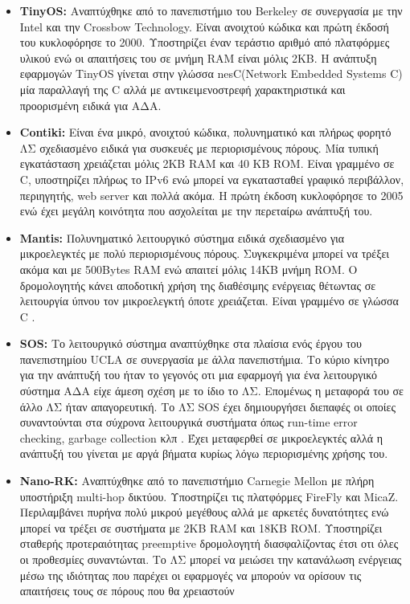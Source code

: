 \begin{itemize}
\item \textbf{TinyOS:} Αναπτύχθηκε από το πανεπιστήμιο του Berkeley σε συνεργασία με την Intel και την Crossbow Technology.
Είναι ανοιχτού κώδικα και πρώτη έκδοσή του κυκλοφόρησε το 2000.
Υποστηρίζει έναν τεράστιο αριθμό από πλατφόρμες υλικού ενώ οι απαιτήσεις του σε μνήμη RAM είναι μόλις 2KB.
Η ανάπτυξη εφαρμογών TinyOS γίνεται στην γλώσσα nesC(Network Embedded Systems C) μία παραλλαγή της C αλλά με αντικειμενοστρεφή χαρακτηριστικά και προορισμένη ειδικά
για ΑΔΑ.
\item \textbf{Contiki:} Είναι ένα μικρό, ανοιχτού κώδικα, πολυνηματικό και πλήρως φορητό ΛΣ σχεδιασμένο ειδικά για συσκευές με περιορισμένους πόρους.
Μία τυπική εγκατάσταση χρειάζεται μόλις 2KB RAM και 40 KB ROM.
Είναι γραμμένο σε C, υποστηρίζει πλήρως το IPv6 ενώ μπορεί να εγκατασταθεί γραφικό περιβάλλον, περιηγητής, web server και πολλά ακόμα.
Η πρώτη έκδοση κυκλοφόρησε το 2005 ενώ έχει μεγάλη κοινότητα που ασχολείται με την περεταίρω ανάπτυξή του.
\item \textbf{Mantis:} Πολυνηματικό λειτουργικό σύστημα ειδικά σχεδιασμένο για μικροελεγκτές με πολύ περιορισμένους πόρους.
Συγκεκριμένα μπορεί να τρέξει ακόμα και με 500Bytes RAM ενώ απαιτεί μόλις 14KB μνήμη ROM.
Ο δρομολογητής κάνει αποδοτική χρήση της διαθέσιμης ενέργειας θέτωντας σε λειτουργία ύπνου τον μικροελεγκτή όποτε χρειάζεται.
Είναι γραμμένο σε γλώσσα C \cite{mantis}.
\item \textbf{SOS:} Το λειτουργικό σύστημα αναπτύχθηκε στα πλαίσια ενός έργου του πανεπιστημίου UCLA σε συνεργασία με άλλα πανεπιστήμια.
Το κύριο κίνητρο για την ανάπτυξή του ήταν το γεγονός οτι μια εφαρμογή για ένα λειτουργικό σύστημα ΑΔΑ είχε άμεση σχέση με το ίδιο το ΛΣ.
Επομένως η μεταφορά του σε άλλο ΛΣ ήταν απαγορευτική.
Το ΛΣ SOS έχει δημιουργήσει διεπαφές οι οποίες συναντούνται στα σύχρονα λειτουργικά συστήματα όπως run-time error checking, garbage collection κλπ \cite{sos_os}.
Έχει μεταφερθεί σε μικροελεγκτές αλλά η ανάπτυξή του γίνεται με αργά βήματα κυρίως λόγω περιορισμένης χρήσης του.
\item \textbf{Nano-RK:} Αναπτύχθηκε από το πανεπιστήμιο Carnegie Mellon με πλήρη υποστήριξη multi-hop δικτύου.
Υποστηρίζει τις πλατφόρμες FireFly και MicaZ.
Περιλαμβάνει πυρήνα πολύ μικρού μεγέθους αλλά με αρκετές δυνατότητες ενώ μπορεί να τρέξει σε συστήματα με 2KB RAM και 18KB ROM.
Υποστηρίζει σταθερής προτεραιότητας preemptive δρομολογητή διασφαλίζοντας έτσι οτι όλες οι προθεσμίες συναντώνται.
Το ΛΣ μπορεί να μειώσει την κατανάλωση ενέργειας μέσω της ιδιότητας που παρέχει οι εφαρμογές να μπορούν να ορίσουν τις απαιτήσεις τους σε πόρους που θα χρειαστούν

\end{itemize}
